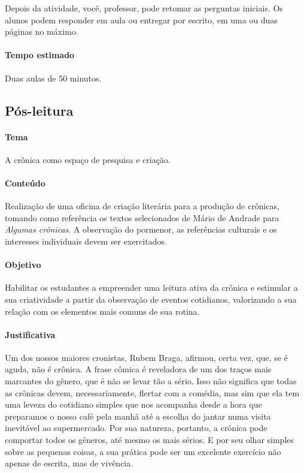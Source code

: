 \documentclass[12pt]{extarticle}
\begin{document}
Depois da atividade, você, professor, pode retomar as perguntas
iniciais. Os alunos podem responder em aula ou entregar por escrito, em
uma ou duas páginas no máximo.

\paragraph{Tempo estimado} Duas aulas de 50 minutos.

\subsection{Pós-leitura}


\paragraph{Tema} A crônica como espaço de pesquisa e criação.

\paragraph{Conteúdo} Realização de uma oficina de criação literária para a
produção de crônicas, tomando como referência os textos selecionados de
Mário de Andrade para \emph{Algumas crônicas}. A observação do pormenor,
as referências culturais e os interesses individuais devem ser
exercitados.

\paragraph{Objetivo} Habilitar os estudantes a empreender uma leitura
ativa da crônica e estimular a sua criatividade a partir da observação
de eventos cotidianos, valorizando a sua relação com os elementos mais
comuns de sua rotina.

\paragraph{Justificativa} Um dos nossos maiores cronistas, Rubem Braga,
afirmou, certa vez, que, se é aguda, não é crônica. A frase cômica é
reveladora de um dos traços mais marcantes do gênero, que é não se levar
tão a sério. Isso não significa que todas as crônicas devem,
necessariamente, flertar com a comédia, mas sim que ela
tem uma leveza do cotidiano simples que nos acompanha desde a hora que
preparamos o nosso café pela manhã até a escolha do jantar numa visita
inevitável ao supermercado. Por sua natureza, portanto, a crônica pode
comportar todos os gêneros, até mesmo os mais sérios. E por seu olhar
simples sobre as pequenas coisas, a sua prática pode ser um excelente
exercício não apenas de escrita, mas de vivência.
\end{document}

